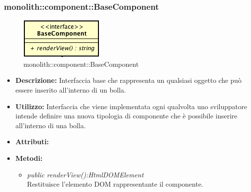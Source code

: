 \subsubsection{monolith::component::BaseComponent}

\label{monolith::component::BaseComponent}
\begin{figure}[H]
	\centering
	\includegraphics[scale=0.5]{Sezioni/SottosezioniST/img/BaseComponent.png}
	\caption{monolith::component::BaseComponent}
\end{figure}

\begin{itemize}
\item \textbf{Descrizione:} Interfaccia base che rappresenta un qualsiasi oggetto che può essere inserito all'interno di un bolla.
\item \textbf{Utilizzo:} Interfaccia che viene implementata ogni qualvolta uno sviluppatore intende definire una nuova tipologia di componente che è possibile inserire all'interno di una bolla.
\item \textbf{Attributi:}
\item \textbf{Metodi:}
\begin{itemize}
\item \textit{public renderView():HtmlDOMElement}\\
Restituisce l'elemento DOM rappresentante il componente.
\end{itemize}
\end{itemize}